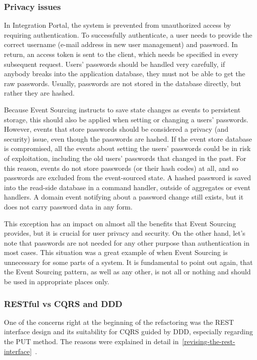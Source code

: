 \documentclass{book}
\begin{document}
\subsubsection{Privacy issues}\label{privacy-issues}

In Integration Portal, the system is prevented from unauthorized access
by requiring authentication. To successfully authenticate, a user needs
to provide the correct username (e-mail address in new user management)
and password. In return, an access token is sent to the client, which
needs be specified in every subsequent request. Users' passwords should
be handled very carefully, if anybody breaks into the application
database, they must not be able to get the raw passwords. Usually,
passwords are not stored in the database directly, but rather they are
hashed.

Because Event Sourcing instructs to save state changes as events to
persistent storage, this should also be applied when setting or changing
a users' passwords. However, events that store passwords should be
considered a privacy (and security) issue, even though the passwords are
hashed. If the event store database is compromised, all the events about
setting the users' passwords could be in risk of exploitation, including
the old users' passwords that changed in the past. For this reason,
events do not store passwords (or their hash codes) at all, and so
passwords are excluded from the event-sourced state. A hashed password
is saved into the read-side database in a command handler, outside of
aggregates or event handlers. A domain event notifying about a password
change still exists, but it does not carry password data in any form.

This exception has an impact on almost all the benefits that Event
Sourcing provides, but it is crucial for user privacy and security. On
the other hand, let's note that passwords are not needed for any other
purpose than authentication in most cases. This situation was a great
example of when Event Sourcing is unnecessary for some parts of a
system. It is fundamental to point out again, that the Event Sourcing
pattern, as well as any other, is not all or nothing and should be used
in appropriate places only.

\subsubsection{RESTful vs CQRS and DDD}\label{restful-vs-cqrs-and-ddd}

One of the concerns right at the beginning of the refactoring was the
REST interface design and its suitability for CQRS guided by DDD,
especially regarding the PUT method. The reasons were explained in
detail
in~\ref{revising-the-rest-interface}~.
\end{document}
